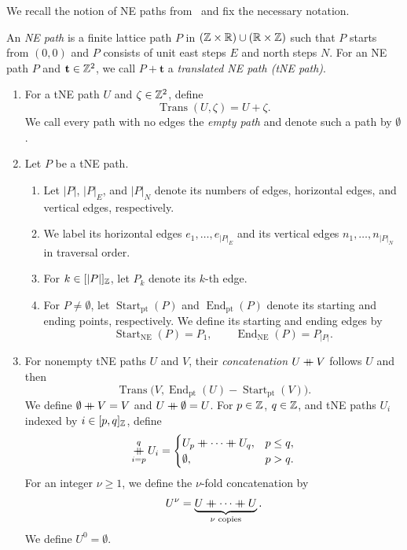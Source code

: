 We recall the notion of NE paths from~\cite{B} and fix the necessary notation.

\begin{definition}\label{def:word}
An \textit{NE path} is a finite lattice path $P$ in
$(\mathbb Z\times\mathbb R)\cup(\mathbb R\times\mathbb Z)$ such that $P$ starts from $(0,0)$ and
$P$ consists of unit east steps $E$ and north steps $N$.
For an NE path $P$ and $\mathbf t\in\mathbb Z^2$, we call $P+\mathbf t$ a \textit{translated NE path (tNE path)}.
\begin{enumerate}[font=\itshape]
\item\label{d:path-translation} For a tNE path $U$ and $\zeta\in\mathbb Z^2$, define
\[
 \operatorname{Trans}(U,\zeta)=U+\zeta.
\]
We call every path with no edges the \textit{empty path} and denote such a path by $\emptyset$.
\item Let $P$ be a tNE path.
\begin{enumerate}[label=(\alph*),font=\itshape]
\item Let $|P|$, $|P|_E$, and $|P|_N$ denote its numbers of edges,
horizontal edges, and vertical edges, respectively.
\item We label its horizontal edges $e_1,\ldots,e_{|P|_E}$ and its vertical
edges $n_1,\ldots,n_{|P|_N}$ in traversal order.
\item For $k\in[|P|]_{\mathbb Z}$, let $P_k$ denote its $k$-th edge.
\item For $P\ne\emptyset$, let $\operatorname{Start}_{\mathrm{pt}}(P)$ and
$\operatorname{End}_{\mathrm{pt}}(P)$ denote its starting and ending points, respectively.
We define its starting and ending edges by
\[
 \operatorname{Start}_{\mathrm{NE}}(P)=P_1,\qquad
 \operatorname{End}_{\mathrm{NE}}(P)=P_{|P|}.
\]
\end{enumerate}
\item\label{d:word-concatenation} For nonempty tNE paths $U$ and $V$, their
\textit{concatenation} $U\mathbin{+\mkern-10mu+} V$ follows $U$ and then
\[
 \operatorname{Trans}\bigl(V,\operatorname{End}_{\mathrm{pt}}(U)-\operatorname{Start}_{\mathrm{pt}}(V)\bigr).
\]
We define $\emptyset\mathbin{+\mkern-10mu+} V=V$ and $U\mathbin{+\mkern-10mu+}\emptyset=U$.
For $p\in\mathbb Z$, $q\in\mathbb Z$, and tNE paths $U_i$ indexed by $i\in[p,q]_{\mathbb Z}$, define
\[
 \mathop{\mathbin{+\mkern-10mu+}}\limits_{i=p}^{q}U_i=
 \begin{cases}
 U_p\mathbin{+\mkern-10mu+}\cdots\mathbin{+\mkern-10mu+} U_q,&p\le q,\\
 \emptyset,&p>q.
 \end{cases}
\]
For an integer $\nu\ge1$, we define the $\nu$-fold concatenation by
\[
 U^\nu=\underbrace{U\mathbin{+\mkern-10mu+}\cdots\mathbin{+\mkern-10mu+} U}_{\nu\text{ copies}}.
\]
We define $U^0=\emptyset$.

\end{enumerate}
\end{definition}
